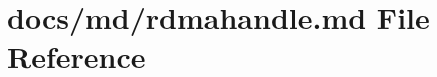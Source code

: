 \hypertarget{rdmahandle_8md}{}\section{docs/md/rdmahandle.md File Reference}
\label{rdmahandle_8md}
